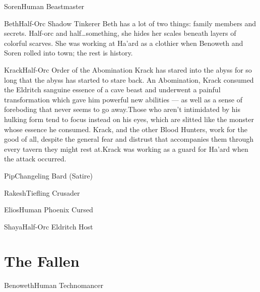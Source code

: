 \documentclass[././main.tex]{subfiles}
\begin{document}
\begin{dndcharacter}[test]{Soren}{Human Beastmaster}
\end{dndcharacter}
\begin{dndcharacter}{Beth}{Half-Orc Shadow Tinkerer}
{Beth has a lot of two things: family members and secrets. Half-orc and half\dots{}something, she hides her scales beneath layers of colorful scarves. She was working at Ha'ard as a clothier when Benoweth and Soren rolled into town; the rest is history.}
\end{dndcharacter}

\begin{dndcharacter}{Krack}{Half-Orc Order of the Abomination}
{Krack has stared into the abyss for so long that the abyss has started to stare back. An Abomination, Krack consumed the Eldritch sanguine essence of a cave beast and underwent a painful transformation which gave him powerful new abilities --- as well as a sense of foreboding that never seems to go away.\newline Those who aren't intimidated by his hulking form tend to focus instead on his eyes, which are slitted like the monster whose essence he consumed. Krack, and the other Blood Hunters, work for the good of all, despite the general fear and distrust that accompanies them through every tavern they might rest at.\newline Krack was working as a guard for Ha'ard when the attack occurred.}
\end{dndcharacter}

\begin{dndcharacter}{Pip}{Changeling Bard (Satire)}
\end{dndcharacter}

\begin{dndcharacter}{Rakesh}{Tiefling Crusader}
\end{dndcharacter}
\begin{dndcharacter}{Elios}{Human Phoenix Cursed}
\end{dndcharacter}
\begin{dndcharacter}{Shaya}{Half-Orc Eldritch Host}
\end{dndcharacter}
\chapter{The Fallen}
\begin{dndcharacter}{Benoweth}{Human Technomancer}
\end{dndcharacter}
\end{document}
